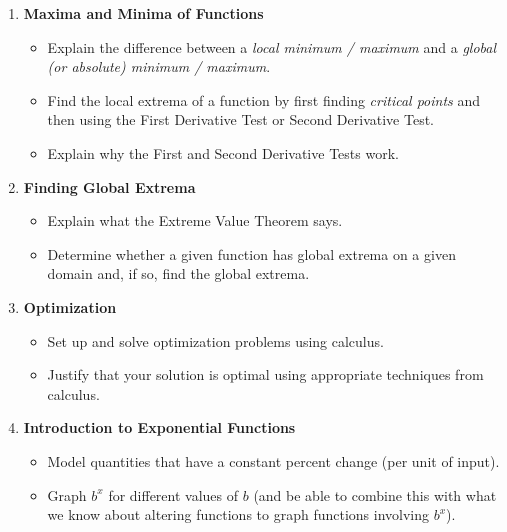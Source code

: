 \documentclass{article}
\begin{document}
\begin{enumerate}[start=16, topsep=0pt]
\begin{itemize}
\end{itemize}

\item \textbf{Maxima and Minima of Functions} %
\begin{itemize}

\item Explain the difference between a \emph{local minimum / maximum} and a \emph{global (or absolute) minimum / maximum}.

\item Find the local extrema of a function by first finding \emph{critical points} and then using the First Derivative Test or Second Derivative Test.

\item Explain why the First and Second Derivative Tests work.

\end{itemize}

\item \textbf{Finding Global Extrema} %
\begin{itemize}
\item Explain what the Extreme Value Theorem says.

\item Determine whether a given function has global extrema on a given domain and, if so, find the global extrema.

\end{itemize}

\item \textbf{Optimization} %
\begin{itemize}
\item Set up and solve optimization problems using calculus.

\item Justify that your solution is optimal using appropriate techniques from calculus.

\end{itemize}

\item \textbf{Introduction to Exponential Functions} %
\begin{itemize}
\item Model quantities that have a constant percent change (per unit of input). 

\item Graph $b^x$ for different values of $b$ (and be able to combine this with what we know about altering functions to graph functions involving $b^x$).


\end{itemize}
\end{enumerate}
\end{document}
